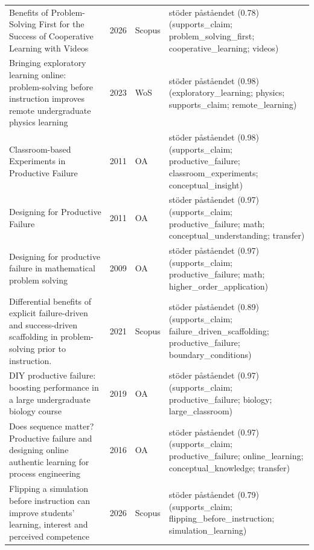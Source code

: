 \begin{longtable}{@{}%
  >{\raggedright\arraybackslash}p{}c%
  >{\raggedright\arraybackslash}p{}%
  >{\raggedright\arraybackslash\footnotesize}p{}@{}}
Benefits of Problem-Solving First for the Success of Cooperative Learning with Videos & 2026 & Scopus & stöder påståendet (0.78) (supports\_\allowbreak{}claim; problem\_\allowbreak{}solving\_\allowbreak{}first; cooperative\_\allowbreak{}learning; videos) \\
Bringing exploratory learning online: problem-solving before instruction improves remote undergraduate physics learning & 2023 & WoS & stöder påståendet (0.98) (exploratory\_\allowbreak{}learning; physics; supports\_\allowbreak{}claim; remote\_\allowbreak{}learning) \\
Classroom-based Experiments in Productive Failure & 2011 & OA & stöder påståendet (0.98) (supports\_\allowbreak{}claim; productive\_\allowbreak{}failure; classroom\_\allowbreak{}experiments; conceptual\_\allowbreak{}insight) \\
Designing for Productive Failure & 2011 & OA & stöder påståendet (0.97) (supports\_\allowbreak{}claim; productive\_\allowbreak{}failure; math; conceptual\_\allowbreak{}understanding; transfer) \\
Designing for productive failure in mathematical problem solving & 2009 & OA & stöder påståendet (0.97) (supports\_\allowbreak{}claim; productive\_\allowbreak{}failure; math; higher\_\allowbreak{}order\_\allowbreak{}application) \\
Differential benefits of explicit failure-driven and success-driven scaffolding in problem-solving prior to instruction. & 2021 & Scopus & stöder påståendet (0.89) (supports\_\allowbreak{}claim; failure\_\allowbreak{}driven\_\allowbreak{}scaffolding; productive\_\allowbreak{}failure; boundary\_\allowbreak{}conditions) \\
DIY productive failure: boosting performance in a large undergraduate biology course & 2019 & OA & stöder påståendet (0.97) (supports\_\allowbreak{}claim; productive\_\allowbreak{}failure; biology; large\_\allowbreak{}classroom) \\
Does sequence matter? Productive failure and designing online authentic learning for process engineering & 2016 & OA & stöder påståendet (0.97) (supports\_\allowbreak{}claim; productive\_\allowbreak{}failure; online\_\allowbreak{}learning; conceptual\_\allowbreak{}knowledge; transfer) \\
Flipping a simulation before instruction can improve students' learning, interest and perceived competence & 2026 & Scopus & stöder påståendet (0.79) (supports\_\allowbreak{}claim; flipping\_\allowbreak{}before\_\allowbreak{}instruction; simulation\_\allowbreak{}learning) \\

\end{longtable}
